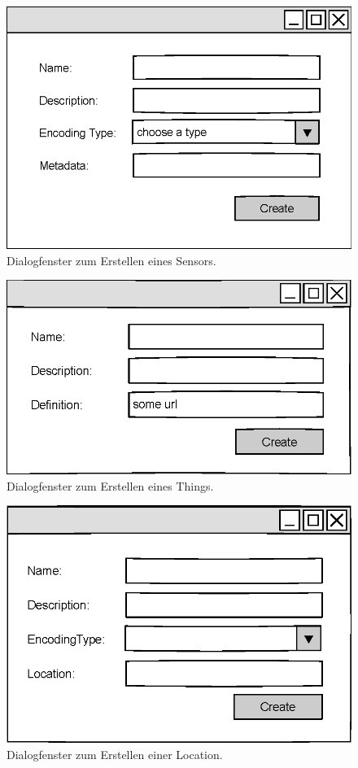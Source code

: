 \documentclass[a4paper, 12 pt]{article}
\begin{document}
\begin{figure}[htbp]
\centering
\includegraphics[scale=1]{images/sensor}
\caption{\label{fig:sensor}Dialogfenster zum Erstellen eines Sensors.}
\end{figure}

\begin{figure}[htbp]
\centering
\includegraphics[scale=1]{images/oprop}
\caption{\label{fig:oprop}Dialogfenster zum Erstellen eines Things.}
\end{figure}

\begin{figure}[htbp]
\centering
\includegraphics[scale=1]{images/loc}
\caption{\label{fig:loc}Dialogfenster zum Erstellen einer Location.}
\end{figure}
\end{document}
